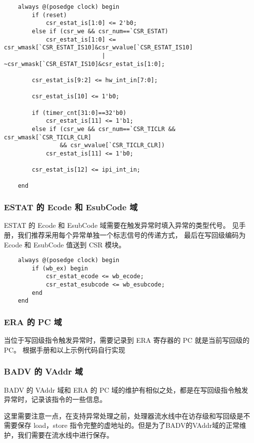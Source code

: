\begin{lstlisting}
    always @(posedge clock) begin
        if (reset)
            csr_estat_is[1:0] <= 2'b0;
        else if (csr_we && csr_num==`CSR_ESTAT)
            csr_estat_is[1:0] <= csr_wmask[`CSR_ESTAT_IS10]&csr_wvalue[`CSR_ESTAT_IS10]
                            | ~csr_wmask[`CSR_ESTAT_IS10]&csr_estat_is[1:0];

        csr_estat_is[9:2] <= hw_int_in[7:0];

        csr_estat_is[10] <= 1'b0;

        if (timer_cnt[31:0]==32'b0)
            csr_estat_is[11] <= 1'b1;
        else if (csr_we && csr_num==`CSR_TICLR && csr_wmask[`CSR_TICLR_CLR]
                && csr_wvalue[`CSR_TICLR_CLR])
            csr_estat_is[11] <= 1'b0;

        csr_estat_is[12] <= ipi_int_in;

    end
\end{lstlisting}

\subsubsection{ESTAT 的 Ecode 和 EsubCode 域}

ESTAT 的 Ecode 和 EsubCode 域需要在触发异常时填入异常的类型代号。
见手册，我们推荐采用每个异常单独一个标志信号的传递方式，
最后在写回级编码为 Ecode 和 EsubCode 值送到 CSR 模块。

\begin{lstlisting}
    always @(posedge clock) begin
        if (wb_ex) begin
            csr_estat_ecode <= wb_ecode;
            csr_estat_esubcode <= wb_esubcode;
        end
    end
\end{lstlisting}

\subsubsection{ERA 的 PC 域}

当位于写回级指令触发异常时，需要记录到 ERA 寄存器的 PC 就是当前写回级的 PC。
根据手册和以上示例代码自行实现

\subsubsection{BADV 的 VAddr 域}

BADV 的 VAddr 域和 ERA 的 PC 域的维护有相似之处，都是在写回级指令触发异常时，记录该指令的一些信息。

这里需要注意一点，在支持异常处理之前，处理器流水线中在访存级和写回级是不需要保存
 load，store 指令完整的虚地址的。但是为了BADV的VAddr域的正常维护，我们需要在流水线中进行保存。

